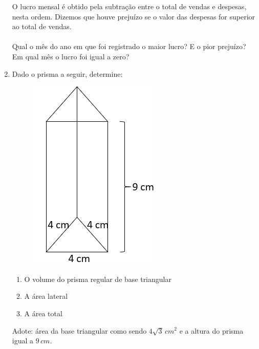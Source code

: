 \documentclass[a4paper, 12pt]{article}
\begin{document}
\begin{enumerate}
O lucro mensal é obtido pela subtração entre o total de vendas e despesas, nesta ordem. Dizemos que houve prejuízo se o valor das despesas for superior ao total de vendas.\\ \\
Qual o mês do ano em que foi registrado o maior lucro? E o pior prejuízo? Em qual mês o lucro foi igual a zero?
\vspace{1cm}


	



	\item Dado o prisma a seguir, determine:
		\begin{figure}[!h]
		\centering
		\includegraphics[scale = 0.50]{prisma}
		\end{figure}
		
		\begin{enumerate}
			\item O volume do prisma regular de base triangular
			\item A área lateral
			\item A área total
		\end{enumerate}		 

Adote: área da base triangular como sendo $4\sqrt{3} \, cm^2$ e a altura do prisma igual a $9 \, cm$.
\vspace{1cm}
	
	
	
	\end{enumerate}	

\end{document}
